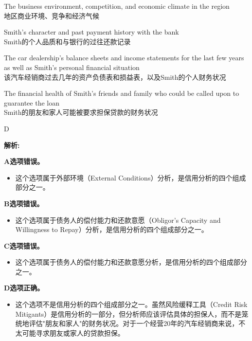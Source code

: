 \documentclass{article}
\newenvironment{explanation}
{\textbf{解析:}\par}
{\par}
\begin{document}
\begin{choices}
    \item The business environment, competition, and economic climate in the region\\
    地区商业环境、竞争和经济气候
    \item Smith's character and past payment history with the bank\\
    Smith的个人品质和与银行的过往还款记录
    \item The car dealership's balance sheets and income statements for the last few years as well as Smith's personal financial situation\\
    该汽车经销商过去几年的资产负债表和损益表，以及Smith的个人财务状况
    \item The financial health of Smith's friends and family who could be called upon to guarantee the loan\\
    Smith的朋友和家人可能被要求担保贷款的财务状况
\end{choices}

\begin{correctanswer}
    D
\end{correctanswer}

\begin{explanation}
    \textbf{A选项错误。}
    \begin{itemize}
        \item 这个选项属于外部环境（External Conditions）分析，是信用分析的四个组成部分之一。
    \end{itemize}
    
    \textbf{B选项错误。}
    \begin{itemize}
        \item 这个选项属于债务人的偿付能力和还款意愿（Obligor's Capacity and Willingness to Repay）分析，是信用分析的四个组成部分之一。
    \end{itemize}
    
    \textbf{C选项错误。}
    \begin{itemize}
        \item 这个选项属于债务人的偿付能力和还款意愿分析，是信用分析的四个组成部分之一。
    \end{itemize}
    
    \textbf{D选项正确。}
    \begin{itemize}
        \item 这个选项不是信用分析的四个组成部分之一。虽然风险缓释工具（Credit Risk Mitigants）是信用分析的一部分，但分析师应该评估具体的担保人，而不是笼统地评估"朋友和家人"的财务状况。对于一个经营20年的汽车经销商来说，不太可能寻求朋友或家人的贷款担保。
    \end{itemize}
\end{explanation}
\end{document}
